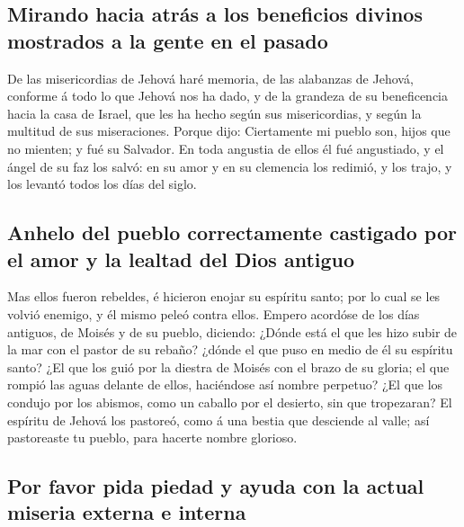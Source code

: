 \hypertarget{mirando-hacia-atruxe1s-a-los-beneficios-divinos-mostrados-a-la-gente-en-el-pasado}{%
\subsection{Mirando hacia atrás a los beneficios divinos mostrados a la
gente en el
pasado}\label{mirando-hacia-atruxe1s-a-los-beneficios-divinos-mostrados-a-la-gente-en-el-pasado}}

 De las misericordias de Jehová haré memoria, de las
alabanzas de Jehová, conforme á todo lo que Jehová nos ha dado, y de la
grandeza de su beneficencia hacia la casa de Israel, que les ha hecho
según sus misericordias, y según la multitud de sus miseraciones.
 Porque dijo: Ciertamente mi pueblo son, hijos que no
mienten; y fué su Salvador.  En toda angustia de ellos él
fué angustiado, y el ángel de su faz los salvó: en su amor y en su
clemencia los redimió, y los trajo, y los levantó todos los días del
siglo.

\hypertarget{anhelo-del-pueblo-correctamente-castigado-por-el-amor-y-la-lealtad-del-dios-antiguo}{%
\subsection{Anhelo del pueblo correctamente castigado por el amor y la
lealtad del Dios
antiguo}\label{anhelo-del-pueblo-correctamente-castigado-por-el-amor-y-la-lealtad-del-dios-antiguo}}

 Mas ellos fueron rebeldes, é hicieron enojar su espíritu
santo; por lo cual se les volvió enemigo, y él mismo peleó contra ellos.
 Empero acordóse de los días antiguos, de Moisés y de su
pueblo, diciendo: ¿Dónde está el que les hizo subir de la mar con el
pastor de su rebaño? ¿dónde el que puso en medio de él su espíritu
santo?  ¿El que los guió por la diestra de Moisés con el
brazo de su gloria; el que rompió las aguas delante de ellos, haciéndose
así nombre perpetuo?  ¿El que los condujo por los
abismos, como un caballo por el desierto, sin que tropezaran?
 El espíritu de Jehová los pastoreó, como á una bestia
que desciende al valle; así pastoreaste tu pueblo, para hacerte nombre
glorioso.

\hypertarget{por-favor-pida-piedad-y-ayuda-con-la-actual-miseria-externa-e-interna}{%
\subsection{Por favor pida piedad y ayuda con la actual miseria externa
e
interna}\label{por-favor-pida-piedad-y-ayuda-con-la-actual-miseria-externa-e-interna}}

